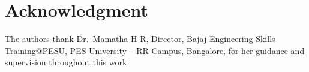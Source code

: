 \documentclass[conference]{IEEEtran}
\begin{document}
\section*{Acknowledgment}
The authors thank Dr.\ Mamatha H R, Director, Bajaj Engineering Skills
Training@PESU, PES University -- RR Campus, Bangalore, for her guidance
and supervision throughout this work.



\end{document}
